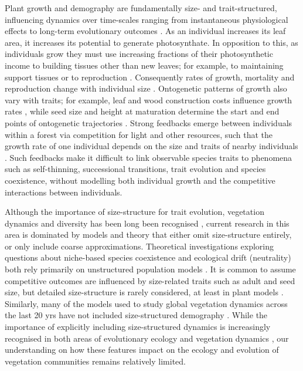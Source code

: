 \documentclass[a4paper,11pt]{article}
\begin{document}
Plant growth and demography are fundamentally size- and
trait-structured, influencing dynamics over time-scales ranging from
instantaneous physiological effects to long-term evolutionary outcomes
\citep{Harper-1977, Westoby-2002}.
%
As an individual increases its leaf area, it increases its potential
to generate photosynthate.
%
In opposition to this, as individuals grow they must use increasing
fractions of their photosynthetic income to building tissues other
than new leaves; for example, to maintaining support tissues
\citep{Givnish-1988, Enquist-2007} or to reproduction
\citep{Thomas-2011}.
%
Consequently rates of growth, mortality and reproduction change with
individual size \citep{Muller-2006, Ruger-2011, Thomas-2011}.
Ontogenetic
patterns of growth also vary with traits; for example,
leaf and wood construction costs influence growth rates
\citep{Wright-2010}, while seed size and height
at maturation determine the start and end points of ontogenetic
trajectories \citep{Westoby-2002}.
%
Strong feedbacks emerge between individuals within a forest via
competition for light and other resources, such that the growth rate
of one individual depends on the size and traits of nearby
individuals \citep{Shugart-1980, Pacala-1996}.
%
Such feedbacks make it difficult to link observable species traits to
phenomena such as self-thinning, successional transitions, trait
evolution and species coexistence, without
modelling both individual growth and the competitive interactions between
individuals.

Although the importance of size-structure for trait evolution, vegetation
dynamics and diversity has been long been recognised \citep[e.g.,][]{Harper-1977,
  Shugart-1980, Huston-1987}, current research in this area is
dominated by models and theory that either omit size-structure
entirely, or only include coarse approximations.
%
Theoretical investigations exploring questions about niche-based
species coexistence and ecological drift (neutrality) both rely
primarily on unstructured population models \citep[e.g.][]{MacArthur-1967,
  Tilman-1985, Geritz-1995, Hubbell-2001, Calcagno-2006}.
%
It is common to assume competitive outcomes are influenced by
size-related traits such as adult and seed size, but detailed
size-structure is rarely considered, at least in plant models
\cite[for animal examples, see][]{Deroos-1988, Deroos-1992}.
%
Similarly, many of the models used to study global vegetation dynamics across
the last 20 yrs have not included size-structured demography
\citep[for comparisons of some major models see][]{Sitch-2008,
Dekauwe-2014}.
%
While the importance of explicitly including size-structured dynamics is
increasingly recognised in both areas of evolutionary ecology
\citep[e.g.][]{Falster-2015} and vegetation dynamics
\citep[e.g.][]{Moorcroft-2001, Purves-2008, Smith-2014,
Weng-2015,Sakschewski-2015}, our understanding on how these features
impact on the ecology and evolution of vegetation communities remains
relatively limited.
\end{document}
